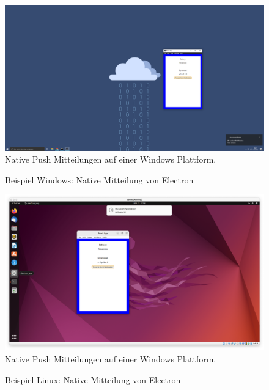 \documentclass[a4paper]{scrartcl}
\begin{document}
\begin{figure}[H]
	\centering
	\caption{Beispiel Windows: Native Mitteilung von Electron}
	\includegraphics[scale=0.15]{_assets/Windows_electron.png} \\
	Native Push Mitteilungen auf einer Windows Plattform.
\end{figure}

\begin{figure}[H]
	\centering
	\caption{Beispiel Linux: Native Mitteilung von Electron}
	\includegraphics[scale=0.2]{_assets/Linux_Electron.png} \\
	Native Push Mitteilungen auf einer Windows Plattform.
\end{figure}
\end{document}

